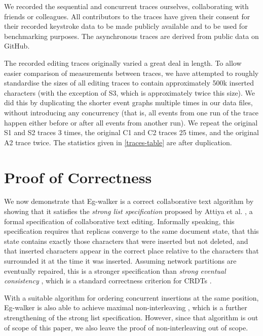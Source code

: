 \documentclass[sigplan,10pt]{acmart}
\newcommand{\algname}{Eg-walker\xspace}
\begin{document}
We recorded the sequential and concurrent traces ourselves, collaborating with friends or colleagues.
All contributors to the traces have given their consent for their recorded keystroke data to be made publicly available and to be used for benchmarking purposes.
The asynchronous traces are derived from public data on GitHub.

The recorded editing traces originally varied a great deal in length.
To allow easier comparison of measurements between traces, we have attempted to roughly standardise the sizes of all editing traces to contain approximately 500k inserted characters (with the exception of S3, which is approximately twice this size).
We did this by duplicating the shorter event graphs multiple times in our data files, without introducing any concurrency (that is, all events from one run of the trace happen either before or after all events from another run).
We repeat the original S1 and S2 traces 3 times, the original C1 and C2 traces 25 times, and the original A2 trace twice.
The statistics given in \autoref{traces-table} are after duplication.

\section{Proof of Correctness}\label{proofs}

We now demonstrate that \algname is a correct collaborative text algorithm by showing that it satisfies the \emph{strong list specification} proposed by Attiya et al. \cite{Attiya2016}, a formal specification of collaborative text editing.
Informally speaking, this specification requires that replicas converge to the same document state, that this state contains exactly those characters that were inserted but not deleted, and that inserted characters appear in the correct place relative to the characters that surrounded it at the time it was inserted.
Assuming network partitions are eventually repaired, this is a stronger specification than \emph{strong eventual consistency} \cite{Shapiro2011}, which is a standard correctness criterion for CRDTs \cite{Gomes2017verifying}.

With a suitable algorithm for ordering concurrent insertions at the same position, \algname is also able to achieve maximal non-interleaving \cite{fugue}, which is a further strengthening of the strong list specification.
However, since that algorithm is out of scope of this paper, we also leave the proof of non-interleaving out of scope.
\end{document}
